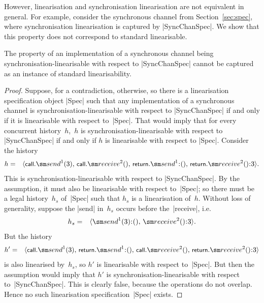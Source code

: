 However, linearisation and synchronisation linearisation are not
equivalent in general.
%
For example, consider the synchronous channel from Section~\ref{sec:spec},
where synchronisation linearisation is captured by |SyncChanSpec|.  We show
that this property does not correspond to standard linearisable. 
%
\begin{prop}
The property of an implementation of a synchronous channel being
synchronisation-linearisable with respect to |SyncChanSpec| cannot be captured
as an instance of standard linearisability.
\end{prop}
%
\begin{proof}
Suppose, for a contradiction, otherwise, so there is a linearisation
specification object |Spec| such that any implementation of a synchronous
channel is synchronisation-linearisable with respect to |SyncChanSpec| if and
only if it is linearisable with respect to~|Spec|.  That would imply that for
every concurrent history~$h$,\, $h$ is synchronisation-linearisable with
respect to |SyncChanSpec| if and only if $h$ is linearisable with respect to
|Spec|.  Consider the history
\begin{eqnarray*}
h & = & \seq{ 
  \call.\send^1(3),\, \call.\receive^2(),\, 
  \return.\send^1\::(),\, \return.\receive^2()\::3 }.
\end{eqnarray*}
%
This is synchronisation-linearisable with respect to |SyncChanSpec|.  By the
assumption, it must also be linearisable with respect to~|Spec|; so there must
be a legal history~$h_s$ of~|Spec| such that $h_s$ is a linearisation of~$h$.
Without loss of generality, suppose the |send| in~$h_s$ occurs before
the~|receive|, i.e.
\begin{eqnarray*}
h_s & = & \seq{ \send^1(3)\::(),\, \receive^2()\::3 }.
\end{eqnarray*}
%
But the history
%
\begin{eqnarray*}
h' & = & \seq{ 
  \call.\send^1(3),\, \return.\send^1\::(),\, 
  \call.\receive^2(),\, \return.\receive^2()\::3 }
\end{eqnarray*}
%
is also linearised by~$h_s$, so $h'$ is linearisable with respect to~|Spec|.
But then the assumption would imply that $h'$ is synchronisation-linearisable
with respect to~|SyncChanSpec|.  This is clearly false, because the operations
do not overlap.  Hence no such linearisation specification~|Spec| exists.
\end{proof}

